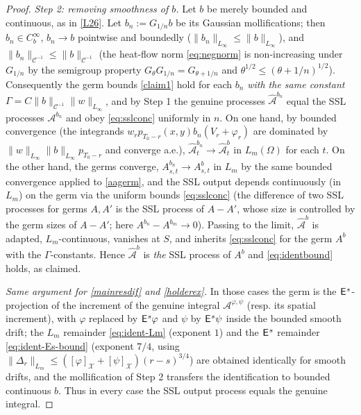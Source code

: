 \documentclass[12pt]{article}
\theoremstyle{definition}
\DeclareMathOperator{\1}{\mathbbm{1}}%
\def\E{\hskip.15ex\mathsf{E}\hskip.10ex}
\def\phi{\varphi}
\renewcommand{\le}{\leqslant}
\newcommand{\A}{\mathcal{A}}
\newcommand{\C}{\mathcal{C}}
\newcommand{\X}{\mathcal{X}}
\begin{document}
\begin{proof}
\emph{Step 2: removing smoothness of $b$.} Let $b$ be merely bounded and continuous, as in
\cref{L26}. Let $b_n:=G_{1/n}b$ be its Gaussian mollifications; then $b_n\in C_b^\infty$,
$b_n\to b$ pointwise and boundedly ($\|b_n\|_{L_\infty}\le\|b\|_{L_\infty}$), and
$\|b_n\|_{\C^{-1}}\le\|b\|_{\C^{-1}}$ (the heat-flow norm \eqref{eq:negnorm} is non-increasing
under $G_{1/n}$ by the semigroup property $G_\theta G_{1/n}=G_{\theta+1/n}$ and
$\theta^{1/2}\le(\theta+1/n)^{1/2}$). Consequently the germ bounds \eqref{claim1} hold for
each $b_n$ \emph{with the same constant} $\Gamma=C\|b\|_{\C^{-1}}\|w\|_{L_\infty}$, and by Step
1 the genuine processes $\widehat{\mathcal A}^{b_n}$ equal the SSL processes $\mathcal A^{b_n}$ and obey
\eqref{eq:sslconc} uniformly in $n$. On one hand, by bounded convergence (the integrands
$w_r p_{T_0-r}(x,y)b_n(V_r+\phi_r)$ are dominated by $\|w\|_{L_\infty}\|b\|_{L_\infty}p_{T_0-r}$
and converge a.e.), $\widehat{\mathcal A}^{b_n}_t\to\widehat{\mathcal A}^{b}_t$ in $L_m(\Omega)$ for each
$t$. On the other hand, the germs converge, $A^{b_n}_{s,t}\to A^{b}_{s,t}$ in $L_m$ by the same
bounded convergence applied to \eqref{aagerm}, and the SSL output depends continuously (in
$L_m$) on the germ via the uniform bounds \eqref{eq:sslconc} (the difference of two SSL
processes for germs $A,A'$ is the SSL process of $A-A'$, whose size is controlled by the germ
sizes of $A-A'$; here $A^{b_n}-A^{b_m}\to0$). Passing to the limit, $\widehat{\mathcal A}^{b}$ is
adapted, $L_m$-continuous, vanishes at $S$, and inherits \eqref{eq:sslconc} for the germ $A^b$
with the $\Gamma$-constants. Hence $\widehat{\mathcal A}^b$ is \emph{the} SSL process of $A^b$ and
\eqref{eq:identbound} holds, as claimed.

\emph{Same argument for \eqref{mainresdif} and \eqref{holderex}.} In those cases the germ is
the $\E^s$-projection of the increment of the genuine integral $\A^{\phi,\psi}$ (resp. its
spatial increment), with $\phi$ replaced by $\E^s\phi$ and $\psi$ by $\E^s\psi$ inside the
bounded smooth drift; the $L_m$ remainder \eqref{eq:ident-Lm} (exponent $1$) and the $\E^s$
remainder \eqref{eq:ident-Es-bound} (exponent $7/4$, using
$\|\Delta_r\|_{L_m}\le([\phi]_\X+[\psi]_\X)(r-s)^{3/4}$) are obtained identically for smooth
drifts, and the mollification of Step 2 transfers the identification to bounded continuous
$b$. Thus in every case the SSL output process equals the genuine integral.
\end{proof}
\end{document}
